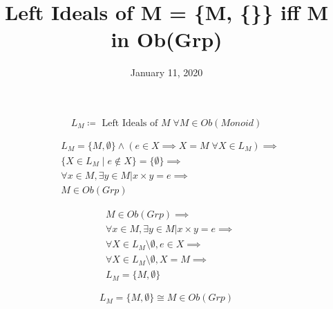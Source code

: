 \documentclass[fleqn, 11pt]{article}
\date{January 11, 2020}
\title{Left Ideals of M = \{M, \{\}\} iff M in Ob(Grp)}
\begin{document}
$$ L_M \coloneqq \text{ Left Ideals of } M \;\forall M \in Ob(Monoid) $$

\begin{equation}
\tag{from}
\begin{aligned}
& L_M = \{M, \emptyset\} \land 
  (e \in X \implies X = M \; \forall X \in L_M) \implies \\
& \{X \in L_M \mid e \notin X\} = \{\emptyset\} \implies \\
& \forall x \in M, \exists y \in M | x \times y = e \implies \\
& M \in Ob(Grp)
\end{aligned}
\end{equation}

\begin{equation}
\tag{to}
\begin{aligned}
& M \in Ob(Grp) \implies \\
& \forall x \in M, \exists y \in M | x \times y = e \implies \\
& \forall X \in L_M \setminus \emptyset, e \in X \implies \\
& \forall X \in L_M \setminus \emptyset, X = M \implies \\
& L_M = \{M, \emptyset\}
\end{aligned}
\end{equation}

\hrulefill

$$ L_M = \{M, \emptyset\} \cong M \in Ob(Grp) $$
\end{document}
